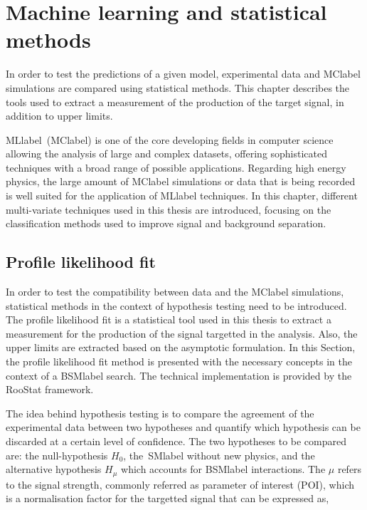 \chapter{Machine learning and statistical methods}
\label{chapter:MLStat}

In order to test the predictions of a given model, experimental data and \acrshort{MClabel} simulations are compared using statistical methods. This chapter describes the tools used to extract a measurement of the production of the target signal, in addition to upper limits.

\acrlong{MLlabel}~(\acrshort{MClabel}) is one of the core developing fields in computer science allowing the analysis of large and complex datasets, offering sophisticated techniques with a broad range of possible applications. Regarding high energy physics, the large amount of \acrshort{MClabel} simulations or data that is being recorded is well suited for the application of \acrshort{MLlabel} techniques. In this chapter, different multi-variate techniques used in this thesis are introduced, focusing on the classification methods used to improve signal and background separation.

\section{Profile likelihood fit}
\label{sec:profilelikelihoodfit}
In order to test the compatibility between data and the \acrshort{MClabel} simulations, statistical methods in the context of hypothesis testing need to be introduced. The profile likelihood fit is a statistical tool used in this thesis to extract a measurement for the production of the signal targetted in the analysis. Also, the upper limits are extracted based on the asymptotic formulation. In this Section, the profile likelihood fit method is presented with the necessary concepts in the context of a \acrshort{BSMlabel} search. %
The technical implementation is provided by the RooStat framework. %

The idea behind hypothesis testing is to compare the agreement of the experimental data between two hypotheses and quantify which hypothesis can be discarded at a certain level of confidence. The two hypotheses to be compared are: the null-hypothesis $H_0$, the~\acrshort{SMlabel} without new physics, and the alternative hypothesis $H_\mu$ which accounts for \acrshort{BSMlabel} interactions. The $\mu$ refers to the signal strength, commonly referred as parameter of interest (POI), which is a normalisation factor for the targetted signal that can be expressed as,

